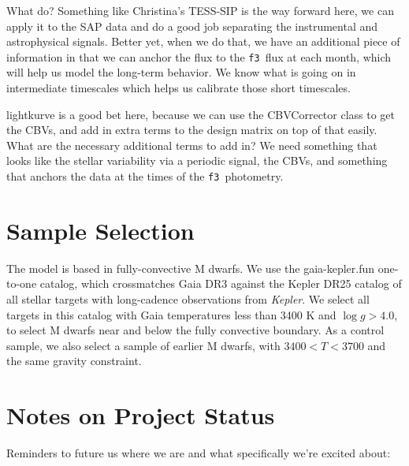 \documentclass[twocolumn,dvipsnames]{aastex631}
\newcommand{\kepler}{\textit{Kepler}\xspace}
\newcommand{\logg}{$\log g$\xspace}
\newcommand{\fthree}{\texttt{f3}}
\begin{document}
What do? Something like Christina's TESS-SIP is the way forward here, we can apply it to the SAP data and do a good job separating the instrumental and astrophysical signals. Better yet, when we do that, we have an additional piece of information in that we can anchor the flux to the \fthree\ flux at each month, which will help us model the long-term behavior. We know what is going on in intermediate timescales which helps us calibrate those short timescales.

lightkurve is a good bet here, because we can use the CBVCorrector class to get the CBVs, and add in extra terms to the design matrix on top of that easily. What are the necessary additional terms to add in? We need something that looks like the stellar variability via a periodic signal, the CBVs, and something that anchors the data at the times of the \fthree\ photometry. 


\section{Sample Selection}

The \citet{Brown21} model is based in fully-convective M dwarfs. We use the gaia-kepler.fun one-to-one catalog, which crossmatches Gaia DR3 against the Kepler DR25 catalog of all stellar targets with long-cadence observations from \kepler. We select all targets in this catalog with Gaia temperatures less than 3400 K and \logg $> 4.0$, to select M dwarfs near and below the fully convective boundary. As a control sample, we also select a sample of earlier M dwarfs, with $3400 < T < 3700$ and the same gravity constraint.


\section{Notes on Project Status}

Reminders to future us where we are and what specifically we're excited about:
\end{document}
